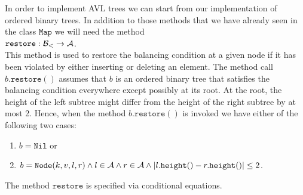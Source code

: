 In order to implement AVL trees we can start from our implementation of ordered binary trees.
In addition to those methods that we have already seen in the class $\texttt{Map}$ we will need the method
\\[0.2cm]
\hspace*{1.3cm} $\texttt{restore}: \mathcal{B}_< \rightarrow \mathcal{A}$. 
\\[0.2cm]
This method is used to restore the balancing condition at a given node if it has been violated by
either inserting or deleting an element.
The method call $b.\texttt{restore}()$ assumes that  $b$ is an ordered binary tree that satisfies
the balancing condition everywhere except possibly at its root. 
At the root, the height of the left subtree might differ from the height of the right subtree by at
most 2.  Hence, when the method $b.\texttt{restore}()$ is invoked we have either of the following
two cases:
\begin{enumerate}
\item $b = \texttt{Nil}$ \quad or
\item $b = \texttt{Node}(k,v,l,r) \wedge l \in \mathcal{A} \wedge r \in \mathcal{A} \wedge
       |l.\texttt{height}() - r.\texttt{height}()| \leq 2$.
\end{enumerate}
The method $\texttt{restore}$ is specified via conditional equations.
